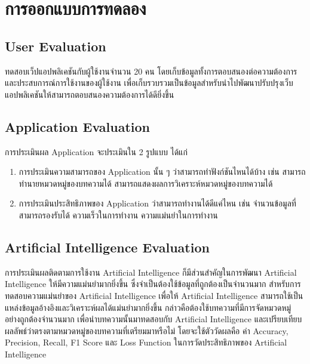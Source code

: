 \documentclass[12pt,oneside,openright,a4paper]{cpe-thai-project}
\begin{document}
\section{การออกแบบการทดลอง}
\subsection{User Evaluation}
\hspace*{1cm}ทดสอบเว็ปแอปพลิเคชันกับผู้ใช้งานจำนวน 20 คน โดยเก็บข้อมูลทั้งการตอบสนองต่อความต้องการและประสบการณ์การใช้งานของผู้ใช้งาน 
เพื่อเก็บรวบรวมเป็นข้อมูลสำหรับนำไปพัฒนาปรับปรุงเว็บแอปพลิเคชันให้สามารถตอบสนองความต้องการได้ดียิ่งขึ้น
\subsection{Application Evaluation}
\hspace*{1cm}การประเมินผล Application จะประเมินใน 2 รูปแบบ ได้แก่
  \begin{enumerate}
    \item การประเมินความสามารถของ Application นั้น ๆ ว่าสามารถทำฟังก์ชันไหนได้บ้าง เช่น สามารถทำนายหมวดหมู่ของบทความได้ สามารถแสดงผลการวิเคราะห์หมวดหมู่ของบทความได้
    \item การประเมินประสิทธิภาพของ Application ว่าสามารถทำงานได้ดีแค่ไหน เช่น จำนวนข้อมูลที่สามารถรองรับได้ ความเร็วในการทำงาน ความแม่นยำในการทำงาน
  \end{enumerate}
\subsection{Artificial Intelligence Evaluation}
\hspace*{1cm}การประเมินผลติดตามการใช้งาน Artificial Intelligence ก็มีส่วนสำคัญในการพัฒนา Artificial Intelligence ให้มีความแม่นยำมากยิ่งขึ้น 
ซึ่งจำเป็นต้องใช้ข้อมูลที่ถูกต้องเป็นจำนวนมาก สำหรับการทดสอบความแม่นยำของ Artificial Intelligence เพื่อให้ Artificial Intelligence สามารถใช้เป็นแหล่งข้อมูลอ้างอิงและวิเคราะห์ผลได้แม่นยำมากยิ่งขึ้น
กล่าวคือต้องใช้บทความที่มีการจัดหมวดหมู่อย่างถูกต้องจำนวนมาก เพื่อนำบทความนั้นมาทดสอบกับ Artificial Intelligence และเปรียบเทียบผลลัพธ์ว่าตรงตามหมวดหมู่ของบทความที่เตรียมมาหรือไม่
โดยจะใช้ตัววัดผลคือ ค่า Accuracy, Precision, Recall, F1 Score และ Loss Function ในการวัดประสิทธิภาพของ Artificial Intelligence
\end{document}

